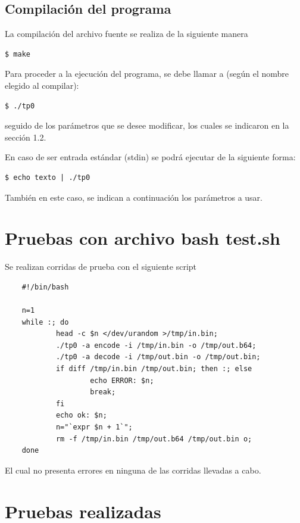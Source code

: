 \documentclass[10pt,a4paper]{article}
\begin{document}
\subsection{Compilación del programa}

La compilación del archivo fuente se realiza de la siguiente manera


\begin{lstlisting}
$ make
\end{lstlisting}


Para proceder a la ejecución del programa, se debe llamar a (según el nombre elegido al compilar):

\begin{lstlisting}
$ ./tp0
\end{lstlisting}

seguido de los parámetros que se desee modificar, los cuales se indicaron en la sección 1.2.

En caso de ser entrada estándar (stdin) se podrá ejecutar de la siguiente forma:

\begin{lstlisting}
$ echo texto | ./tp0
\end{lstlisting}

También en este caso, se indican a continuación los parámetros a usar.

\newpage

\section{Pruebas con archivo bash test.sh}
Se realizan corridas de prueba con el siguiente script

\begin{lstlisting}
    #!/bin/bash

    n=1
    while :; do
            head -c $n </dev/urandom >/tmp/in.bin;
            ./tp0 -a encode -i /tmp/in.bin -o /tmp/out.b64;
            ./tp0 -a decode -i /tmp/out.bin -o /tmp/out.bin;
            if diff /tmp/in.bin /tmp/out.bin; then :; else
                    echo ERROR: $n;
                    break;
            fi
            echo ok: $n;
            n="`expr $n + 1`";
            rm -f /tmp/in.bin /tmp/out.b64 /tmp/out.bin o;
    done

\end{lstlisting}

El cual no presenta errores en ninguna de las corridas llevadas a cabo.

\newpage

\section{Pruebas realizadas}
\end{document}
